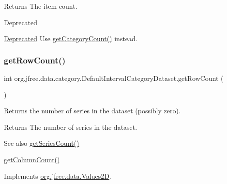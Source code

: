 \begin{DoxyReturn}{Returns}
The item count.
\end{DoxyReturn}
\begin{DoxyRefDesc}{Deprecated}
\item[\mbox{\hyperlink{deprecated__deprecated000254}{Deprecated}}]Use \mbox{\hyperlink{classorg_1_1jfree_1_1data_1_1category_1_1_default_interval_category_dataset_af1e71ac84aa326b3b7ef89c398e5c0fb}{get\+Category\+Count()}} instead. \end{DoxyRefDesc}
\mbox{\label{classorg_1_1jfree_1_1data_1_1category_1_1_default_interval_category_dataset_af827538c915c040aac83c23bc980b0f5}} 
\subsubsection{\texorpdfstring{get\+Row\+Count()}{getRowCount()}}
{\footnotesize\ttfamily int org.\+jfree.\+data.\+category.\+Default\+Interval\+Category\+Dataset.\+get\+Row\+Count (\begin{DoxyParamCaption}{ }\end{DoxyParamCaption})}

Returns the number of series in the dataset (possibly zero).

\begin{DoxyReturn}{Returns}
The number of series in the dataset.
\end{DoxyReturn}
\begin{DoxySeeAlso}{See also}
\mbox{\hyperlink{classorg_1_1jfree_1_1data_1_1category_1_1_default_interval_category_dataset_a78f53d6f3fd5af45da391c7473385ced}{get\+Series\+Count()}} 

\mbox{\hyperlink{classorg_1_1jfree_1_1data_1_1category_1_1_default_interval_category_dataset_a6c5f88da1428294d43e58d41fdf81992}{get\+Column\+Count()}} 
\end{DoxySeeAlso}


Implements \mbox{\hyperlink{interfaceorg_1_1jfree_1_1data_1_1_values2_d_a9ce939b45128515a9841a7d018a6ad0e}{org.\+jfree.\+data.\+Values2D}}.

